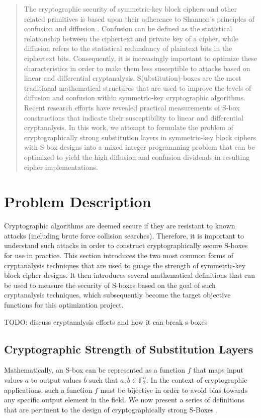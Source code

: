 \documentclass[11pt]{article}
\newcommand{\field}[1]{\mathbb{#1}} %
\begin{document}

\begin{abstract}
The cryptographic security of symmetric-key block ciphers and other related primitives is based upon their adherence to Shannon's principles of confusion and diffusion \cite{Kim90astudy}. Confusion can be defined as the statistical relationship between the ciphertext and private key of a cipher, while diffusion refers to the statistical redundancy of plaintext bits in the ciphertext bits. Consequently, it is increasingly important to optimize these characteristics in order to make them less susceptible to attacks based on linear and differential cryptanalysis. S(ubstitution)-boxes are the most traditional mathematical structures that are used to improve the levels of diffusion and confusion within symmetric-key cryptographic algorithms. Recent research efforts have revealed practical measurements of S-box constructions that indicate their susceptibility to linear and differential cryptanalysis. In this work, we attempt to formulate the problem of cryptographically strong substitution layers in symmetric-key block ciphers with S-box designs into a mixed integer programming problem that can be optimized to yield the high diffusion and confusion dividends in resulting cipher implementations.
\end{abstract}

\section{Problem Description}
Cryptographic algorithms are deemed secure if they are resistant to known attacks (including brute force collision searches). Therefore, it is important to understand such attacks in order to construct cryptographically secure S-boxes for use in practice. This section introduces the two most common forms of cryptanalysis techniques that are used to guage the strength of symmetric-key block cipher designs. It then introduces several mathematical definitions that can be used to measure the security of S-boxes based on the goal of such cryptanalysis techniques, which subsequently become the target objective functions for this optimization project.

TODO: discuss cryptanalysis efforts and how it can break s-boxes

\subsection{Cryptographic Strength of Substitution Layers}
Mathematically, an S-box can be represented as a function $f$ that maps input values $a$ to output values $b$ such that $a,b \in \field{F}_2^n$. In the context of cryptographic applications, such a function $f$ must be bijective in order to avoid bias towards any specific output element in the field. We now present a series of definitions that are pertinent to the design of cryptographically strong S-Boxes \cite{Mar_newanalysis}.
\end{document}
